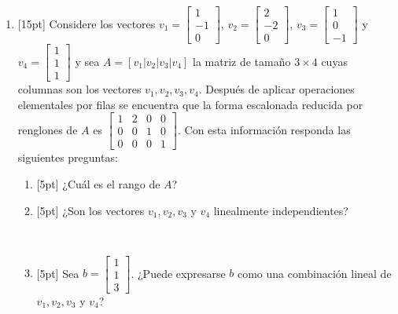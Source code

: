 \documentclass[11pt]{article}
\newcommand{\sino}{\fbox{Sí}\ \fbox{No}}
\begin{document}
\begin{enumerate}
\item{}[15pt] Considere los vectores $v_1 = \begin{bmatrix}1\\-1\\0\end{bmatrix}$, $v_2 = \begin{bmatrix}2\\-2\\0\end{bmatrix}$, $v_3 = \begin{bmatrix}1\\0\\-1\end{bmatrix}$ y $v_4 = \begin{bmatrix}1\\1\\1\end{bmatrix}$ y sea $A = [v_1|v_2|v_3|v_4]$ la matriz de tamaño $3\times 4$ cuyas columnas son los vectores $v_1,v_2,v_3,v_4$. Después de aplicar operaciones elementales por filas se encuentra que la forma escalonada reducida por renglones de $A$ es $\begin{bmatrix}1 & 2 & 0 & 0\\ 0 & 0 & 1 & 0\\ 0 & 0 & 0 & 1\end{bmatrix}$. Con esta información responda las siguientes preguntas:
\begin{enumerate}
\item{}[5pt] ¿Cuál es el rango de $A$?

\vspace{4pt}

\item{}[5pt] ¿Son los vectores $v_1, v_2, v_3$ y $v_4$ linealmente independientes?

\vspace{4pt}
\sino

\item{}[5pt] Sea $b = \begin{bmatrix}1\\1\\3\end{bmatrix}$. ¿Puede expresarse $b$ como una combinación lineal de $v_1, v_2, v_3$ y $v_4$?

\vspace{4pt}
\sino
\end{enumerate}


\end{enumerate}
\end{document}
